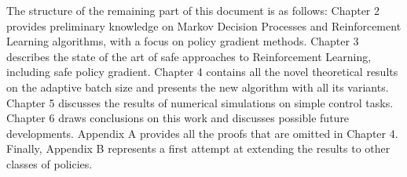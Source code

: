 The structure of the remaining part of this document is as follows: Chapter 2 provides preliminary knowledge on Markov Decision Processes and Reinforcement Learning algorithms, with a focus on policy gradient methods. Chapter 3 describes the state of the art of safe approaches to Reinforcement Learning, including safe policy gradient. Chapter 4 contains all the novel theoretical results on the adaptive batch size and presents the new algorithm with all its variants. Chapter 5 discusses the results of numerical simulations on simple control tasks. Chapter 6 draws conclusions on this work and discusses possible future developments.
Appendix A provides all the proofs that are omitted in Chapter 4. Finally, Appendix B represents a first attempt at extending the results to other classes of policies.
